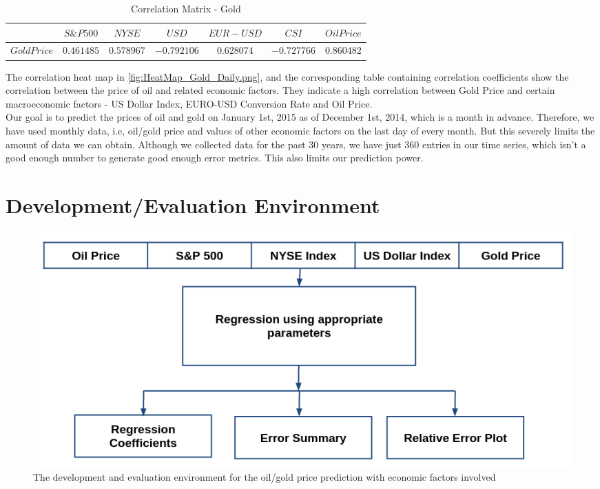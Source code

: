 \documentclass[runningheads]{llncs}
\begin{document}
\begin{table}
\begin{center}
\begin{tabular}{|c|c|c|c|c|c|c|}
\hline
$ $ & $ S\&P 500 $ & $ NYSE $ & $ USD $ & $EUR-USD$ & $CSI$ &$Oil Price$ \\  \hline
$Gold Price$ & $0.461485$ & $0.578967$ & $-0.792106$ & $0.628074$ & $-0.727766$ & $0.860482$ \\ \hline
\end{tabular}
\end{center}
\caption{Correlation Matrix - Gold}
\end{table}

The correlation heat map in \autoref{fig:HeatMap_Gold_Daily.png}, and the corresponding table containing correlation coefficients show the correlation between the price of oil and related economic factors. They indicate a high correlation between Gold Price and certain macroeconomic factors - US Dollar Index, EURO-USD Conversion Rate and Oil Price.\\

\noindent Our goal is to predict the prices of oil and gold on January 1st, 2015 as of December 1st, 2014, which is a month in advance. Therefore, we have used monthly data, i.e, oil/gold price and values of other economic factors on the last day of every month. But this severely limits the amount of data we can obtain. Although we collected data for the past 30 years, we have just 360 entries in our time series, which isn't a good enough number to generate good enough error metrics. This also limits our prediction power. \\

\newpage
\section{Development/Evaluation Environment}

\begin{figure}
\centering
\includegraphics[width=\textwidth]{DevelopmentFlowchart.png}
\caption{The development and evaluation environment for the oil/gold price prediction with economic factors involved}
\label{fig:DevelopmentFlowchart.png}
\end{figure}
\end{document}
